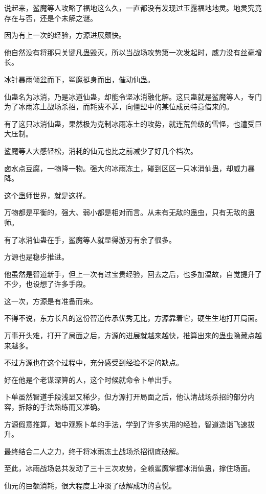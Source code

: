 \begin{this_body}
说起来，鲨魔等人攻略了福地这么久，一直都没有发现过玉露福地地灵。地灵究竟存在与否，还是个未解之谜。

因为有上一次的经验，方源进展颇快。

他自然没有将那只关键凡蛊毁灭，所以当战场攻势第一次发起时，威力没有丝毫增长。

冰针暴雨倾盆而下，鲨魔挺身而出，催动仙蛊。

仙蛊名为冰消，乃是冰道仙蛊，却能令坚冰消融化解。这只蛊就是鲨魔等人，专门为了冰雨冻土战场杀招，而耗费不菲，向僵盟中的某位成员特意借来的。

有了这只冰消仙蛊，果然极为克制冰雨冻土的攻势，就连荒兽级的雪怪，也遭受巨大压制。

鲨魔等人大感轻松，消耗的仙元也比之前减少了好几个档次。

卤水点豆腐，一物降一物。强大的冰雨冻土，碰到区区一只冰消仙蛊，却威力暴降。

这个蛊师世界，就是这样。

万物都是平衡的，强大、弱小都是相对而言。从未有无敌的蛊虫，只有无敌的蛊师。

有了冰消仙蛊在手，鲨魔等人就显得游刃有余了很多。

方源也是稳步推进。

他虽然是智道新手，但上一次有过宝贵经验，回去之后，也多加温故，自觉提升了不少，也设想了许多手段。

这一次，方源是有准备而来。

不得不说，东方长凡的这份智道传承优秀无比，方源靠着它，硬生生地打开局面。

万事开头难，打开了局面之后，方源的进展就越来越快，推算出来的蛊虫隐藏点越来越多。

不过方源也在这个过程中，充分感受到经验不足的缺点。

好在他是个老谋深算的人，这个时候就命令卜单出手。

卜单虽然智道手段浅显又稀少，但方源打开局面之后，他认清战场杀招的部分内容，拆除的手法熟练而又准确。

方源假意推算，暗中观察卜单的手法，学到了许多实用的经验，智道造诣飞速拔升。

最终结合二人之力，终于将冰雨冻土战场杀招彻底破解。

至此，冰雨战场总共发动了三十三次攻势，全赖鲨魔掌握冰消仙蛊，撑住场面。

仙元的巨额消耗，很大程度上冲淡了破解成功的喜悦。

\end{this_body}

